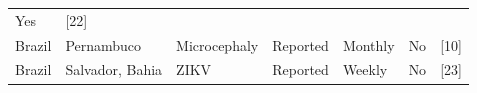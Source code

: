 \documentclass[10pt,letterpaper]{article}
\begin{document}
\begin{longtable}[]{@{}lllllll@{}}
\begin{minipage}[t]{0.04\columnwidth}
Yes\strut
\end{minipage} & \begin{minipage}[t]{0.08\columnwidth}\raggedright\strut
{[}22{]}\strut
\end{minipage}\tabularnewline
\begin{minipage}[t]{0.03\columnwidth}\raggedright\strut
Brazil\strut
\end{minipage} & \begin{minipage}[t]{0.37\columnwidth}\raggedright\strut
Pernambuco\strut
\end{minipage} & \begin{minipage}[t]{0.08\columnwidth}\raggedright\strut
Microcephaly\strut
\end{minipage} & \begin{minipage}[t]{0.17\columnwidth}\raggedright\strut
Reported\strut
\end{minipage} & \begin{minipage}[t]{0.04\columnwidth}\raggedright\strut
Monthly\strut
\end{minipage} & \begin{minipage}[t]{0.04\columnwidth}\raggedright\strut
No\strut
\end{minipage} & \begin{minipage}[t]{0.08\columnwidth}\raggedright\strut
{[}10{]}\strut
\end{minipage}\tabularnewline
\begin{minipage}[t]{0.03\columnwidth}\raggedright\strut
Brazil\strut
\end{minipage} & \begin{minipage}[t]{0.37\columnwidth}\raggedright\strut
Salvador, Bahia\strut
\end{minipage} & \begin{minipage}[t]{0.08\columnwidth}\raggedright\strut
ZIKV\strut
\end{minipage} & \begin{minipage}[t]{0.17\columnwidth}\raggedright\strut
Reported\strut
\end{minipage} & \begin{minipage}[t]{0.04\columnwidth}\raggedright\strut
Weekly\strut
\end{minipage} & \begin{minipage}[t]{0.04\columnwidth}\raggedright\strut
No\strut
\end{minipage} & \begin{minipage}[t]{0.08\columnwidth}\raggedright\strut
{[}23{]}\strut
\end{minipage}\tabularnewline

\end{longtable}
\end{document}
